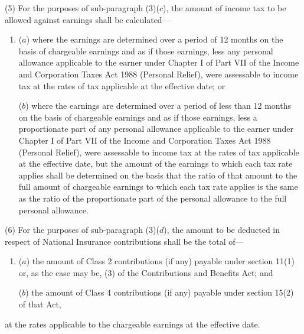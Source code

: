 \documentclass[a4paper]{article}
\begin{document}
(5) For the purposes of sub-paragraph (3)($c$), the amount of income tax to be allowed against earnings shall be calculated—
\begin{enumerate}\item[]
($a$) where the earnings are determined over a period of 12 months on the basis of chargeable earnings and as if those earnings, less any personal allowance applicable to the earner under Chapter I of Part VII of the Income and Corporation Taxes Act 1988 (Personal Relief), were assessable to income tax at the rates of tax applicable at the effective date; or

($b$) where the earnings are determined over a period of less than 12 months on the basis of chargeable earnings and as if those earnings, less a proportionate part of any personal allowance applicable to the earner under Chapter I of Part VII of the Income and Corporation Taxes Act 1988 (Personal Relief), were assessable to income tax at the rates of tax applicable at the effective date, but the amount of the earnings to which each tax rate applies shall be determined on the basis that the ratio of that amount to the full amount of chargeable earnings to which each tax rate applies is the same as the ratio of the proportionate part of the personal allowance to the full personal allowance.
\end{enumerate}

(6) For the purposes of sub-paragraph (3)($d$), the amount to be deducted in respect of National Insurance contributions shall be the total of—
\begin{enumerate}\item[]
($a$) the amount of Class 2 contributions (if any) payable under section 11(1) or, as the case may be, 
(3)  %
of the Contributions and Benefits Act; and

($b$) the amount of Class 4 contributions (if any) payable under section 15(2) of that Act,
\end{enumerate}
at the rates applicable 
to the chargeable earnings %
at the effective date.

%
\end{document}
